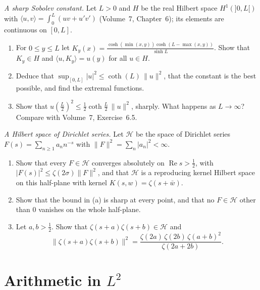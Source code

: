 \begin{exercise}[$\star\star$]\label{pb:sobolev}
\emph{A sharp Sobolev constant.} Let $L>0$ and $H$ be the real Hilbert space $H^1(]0,L[)$ with $\langle u,v\rangle=\int_0^L(uv+u'v')$ (Volume~7, Chapter~6);
its elements are continuous on $[0,L]$.
\begin{enumerate}[label=(\alph*)]
\item For $0\le y\le L$ let $K_y(x)=\frac{\cosh(\min(x,y))\cosh(L-\max(x,y))}{\sinh L}$. Show that $K_y\in H$ and $\langle u,K_y\rangle=u(y)$ for all $u\in H$.
\item Deduce that $\sup_{[0,L]}|u|^2\le\coth(L)\,\|u\|^2$, that the constant is the best possible, and find the extremal functions.
\item Show that $u(\frac L2)^2\le\frac12\coth\frac L2\,\|u\|^2$, sharply. What happens as $L\to\infty$? Compare with Volume~7, Exercise~6.5.
\end{enumerate}
\end{exercise}

\begin{exercise}[$\star\star$]\label{pb:dirichlet}
\emph{A Hilbert space of Dirichlet series.} Let $\mathcal H$ be the space of Dirichlet series $F(s)=\sum_{n\ge1}a_nn^{-s}$ with $\|F\|^2=\sum_n|a_n|^2<\infty$.
\begin{enumerate}[label=(\alph*)]
\item Show that every $F\in\mathcal H$ converges absolutely on $\operatorname{Re}s>\frac12$, with $|F(s)|^2\le\zeta(2\sigma)\|F\|^2$, and that $\mathcal H$ is a reproducing
kernel Hilbert space on this half-plane with kernel $K(s,w)=\zeta(s+\bar w)$.
\item Show that the bound in (a) is sharp at every point, and that no $F\in\mathcal H$ other than $0$ vanishes on the whole half-plane.
\item Let $a,b>\frac12$. Show that $\zeta(s+a)\zeta(s+b)\in\mathcal H$ and
\[
\|\zeta(s+a)\zeta(s+b)\|^2=\frac{\zeta(2a)\,\zeta(2b)\,\zeta(a+b)^2}{\zeta(2a+2b)}.
\]
\end{enumerate}
\end{exercise}

\section{Arithmetic in \texorpdfstring{$L^2$}{L2}}

